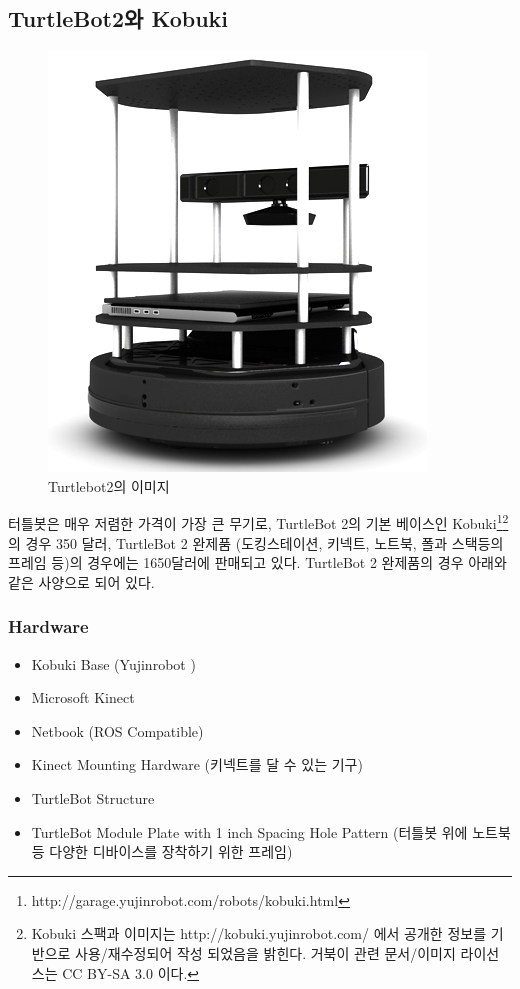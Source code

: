 \subsection{TurtleBot2와 Kobuki}

\begin{figure}[h]
\centering\includegraphics[width=0.3\columnwidth]{pictures/chapter10/turtlebot2.png}
\caption{Turtlebot2의 이미지}
\end{figure}

터틀봇은 매우 저렴한 가격이 가장 큰 무기로, TurtleBot 2의 기본 베이스인 Kobuki\footnote{http://garage.yujinrobot.com/robots/kobuki.html}\footnote{Kobuki 스팩과 이미지는 http://kobuki.yujinrobot.com/ 에서 공개한 정보를 기반으로 사용/재수정되어 작성 되었음을 밝힌다. 거북이 관련 문서/이미지 라이선스는 CC BY-SA 3.0 이다.} 의 경우 350 달러, TurtleBot 2 완제품 (도킹스테이션, 키넥트, 노트북, 폴과 스택등의 프레임 등)의 경우에는 1650달러에 판매되고 있다. TurtleBot 2 완제품의 경우 아래와 같은 사양으로 되어 있다.

\subsubsection{Hardware}

\begin{itemize}[leftmargin=*]
\item Kobuki Base (Yujinrobot )
\item Microsoft Kinect
\item Netbook (ROS Compatible)
\item Kinect Mounting Hardware (키넥트를 달 수 있는 기구)
\item TurtleBot Structure
\item TurtleBot Module Plate with 1 inch Spacing Hole Pattern (터틀봇 위에 노트북 등 다양한 디바이스를 장착하기 위한 프레임)
\end{itemize}

